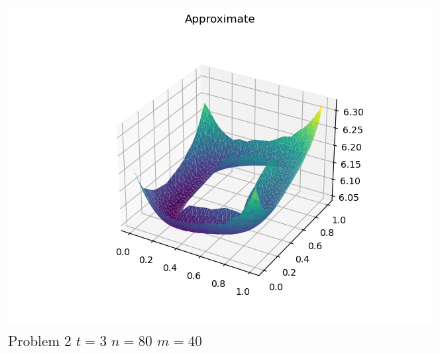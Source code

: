 \documentclass{report}
\begin{document}
\begin{figure}[h]
	\caption{Problem 2 $t = 3$ $n = 80$ $m = 40$}
	\includegraphics[width=\textwidth]{example.png}
\end{figure}
\end{document}
